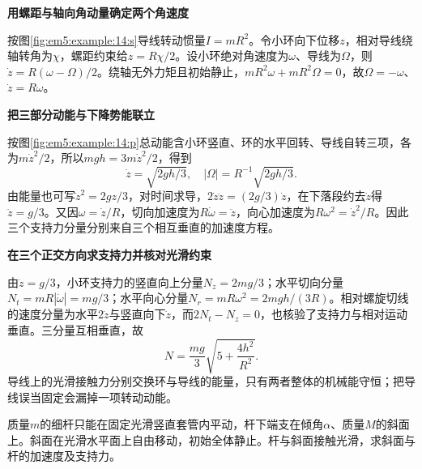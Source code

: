 \begin{solution}\textbf{用螺距与轴向角动量确定两个角速度}\par\nobreak
按图\ref{fig:em5:example:14:s}导线转动惯量$I=mR^2$。令小环向下位移$z$，相对导线绕轴转角为$\chi$，螺距约束给$z=R\chi/2$。设小环绝对角速度为$\omega$、导线为$\Omega$，则$\dot z=R(\omega-\Omega)/2$。绕轴无外力矩且初始静止，$mR^2\omega+mR^2\Omega=0$，故$\Omega=-\omega$、$\dot z=R\omega$。



\par\medskip{}\noindent\textbf{把三部分动能与下降势能联立}\par\nobreak
按图\ref{fig:em5:example:14:p}总动能含小环竖直、环的水平回转、导线自转三项，各为$m\dot z^2/2$，所以$mgh=3m\dot z^2/2$，得到
\[\boxed{\dot z=\sqrt{2gh/3},\quad|\Omega|=R^{-1}\sqrt{2gh/3}}.\]
由能量也可写$\dot z^2=2gz/3$，对时间求导，$2\dot z\ddot z=(2g/3)\dot z$，在下落段约去$\dot z$得$\ddot z=g/3$。又因$\omega=\dot z/R$，切向加速度为$R\dot\omega=\ddot z$，向心加速度为$R\omega^2=\dot z^2/R$。因此三个支持力分量分别来自三个相互垂直的加速度方程。



\par\medskip{}\noindent\textbf{在三个正交方向求支持力并核对光滑约束}\par\nobreak
由$\ddot z=g/3$，小环支持力的竖直向上分量$N_z=2mg/3$；水平切向分量$N_t=mR|\dot\omega|=mg/3$；水平向心分量$N_r=mR\omega^2=2mgh/(3R)$。相对螺旋切线的速度分量为水平$2\dot z$与竖直向下$\dot z$，而$2N_t-N_z=0$，也核验了支持力与相对运动垂直。三分量互相垂直，故
\[\boxed{N=\frac{mg}{3}\sqrt{5+\frac{4h^2}{R^2}}}.\]
导线上的光滑接触力分别交换环与导线的能量，只有两者整体的机械能守恒；把导线误当固定会漏掉一项转动动能。\end{solution}
\begin{question}\begin{example}[竖直滑杆与自由斜面]\label{em5:example:15}
质量$m$的细杆只能在固定光滑竖直套管内平动，杆下端支在倾角$\alpha$、质量$M$的斜面上。斜面在光滑水平面上自由移动，初始全体静止。杆与斜面接触光滑，求斜面与杆的加速度及支持力。
\end{example}
\end{question}
